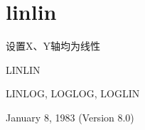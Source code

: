 \section{linlin}
\label{cmd:linlin}

设置X、Y轴均为线性

LINLIN

LINLOG, LOGLOG, LOGLIN

January 8, 1983 (Version 8.0)
